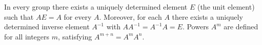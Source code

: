 In every group there exists a uniquely determined element $E$ (the unit element) such that $AE = A$ for every $A$. Moreover, for each $A$ there exists a uniquely determined inverse element $A^{-1}$ with $A A^{-1} = A^{-1} A = E$. Powers $A^m$ are defined for all integers $m$, satisfying $A^{m+n} = A^m A^n$.

